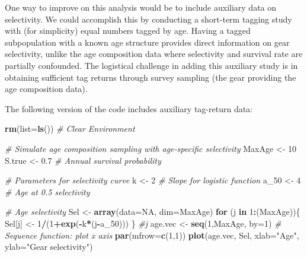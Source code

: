 \documentclass[
]{krantz}
\makeatletter
\newenvironment{Shaded}{\begin{snugshade}}{\end{snugshade}}
\newcommand{\AttributeTok}[1]{\textcolor[rgb]{0.27,0.27,0.27}{#1}}
\newcommand{\CommentTok}[1]{\textcolor[rgb]{0.37,0.37,0.37}{\textit{#1}}}
\newcommand{\ConstantTok}[1]{\textcolor[rgb]{0.37,0.37,0.37}{#1}}
\newcommand{\ControlFlowTok}[1]{\textcolor[rgb]{0.27,0.27,0.27}{\textbf{#1}}}
\newcommand{\DecValTok}[1]{\textcolor[rgb]{0.06,0.06,0.06}{#1}}
\newcommand{\FloatTok}[1]{\textcolor[rgb]{0.06,0.06,0.06}{#1}}
\newcommand{\FunctionTok}[1]{\textcolor[rgb]{0.27,0.27,0.27}{\textbf{#1}}}
\newcommand{\NormalTok}[1]{#1}
\newcommand{\OtherTok}[1]{\textcolor[rgb]{0.37,0.37,0.37}{#1}}
\newcommand{\SpecialCharTok}[1]{\textcolor[rgb]{0.43,0.43,0.43}{\textbf{#1}}}
\newcommand{\StringTok}[1]{\textcolor[rgb]{0.5,0.5,0.5}{#1}}
\newenvironment{kframe}{%
\medskip{}
\setlength{\fboxsep}{.8em}
 \def\at@end@of@kframe{}%
 \ifinner\ifhmode%
  \def\at@end@of@kframe{\end{minipage}}%
  \begin{minipage}{\columnwidth}%
 \fi\fi%
 \def\FrameCommand##1{\hskip\@totalleftmargin \hskip-\fboxsep
 \colorbox{shadecolor}{##1}\hskip-\fboxsep
     \hskip-\linewidth \hskip-\@totalleftmargin \hskip\columnwidth}%
 \MakeFramed {\advance\hsize-\width
   \@totalleftmargin\z@ \linewidth\hsize
   \@setminipage}}%
 {\par\unskip\endMakeFramed%
 \at@end@of@kframe}
\renewenvironment{Shaded}{\begin{kframe}}{\end{kframe}}
\makeatother
\begin{document}
One way to improve on this analysis would be to include auxiliary data on selectivity. We could accomplish this by conducting a short-term tagging study with (for simplicity) equal numbers tagged by age. Having a tagged subpopulation with a known age structure provides direct information on gear selectivity, unlike the age composition data where selectivity and survival rate are partially confounded. The logistical challenge in adding this auxiliary study is in obtaining sufficient tag returns through survey sampling (the gear providing the age composition data).

The following version of the code includes auxiliary tag-return data:

\begin{Shaded}
\begin{Highlighting}[]
\FunctionTok{rm}\NormalTok{(}\AttributeTok{list=}\FunctionTok{ls}\NormalTok{()) }\CommentTok{\# Clear Environment}

\CommentTok{\# Simulate age composition sampling with age{-}specific selectivity}
\NormalTok{MaxAge }\OtherTok{\textless{}{-}} \DecValTok{10}
\NormalTok{S.true }\OtherTok{\textless{}{-}} \FloatTok{0.7} \CommentTok{\# Annual survival probability}

\CommentTok{\# Parameters for selectivity curve}
\NormalTok{k }\OtherTok{\textless{}{-}} \DecValTok{2} \CommentTok{\# Slope for logistic function}
\NormalTok{a\_50 }\OtherTok{\textless{}{-}} \DecValTok{4} \CommentTok{\# Age at 0.5 selectivity}

\CommentTok{\# Age selectivity}
\NormalTok{Sel }\OtherTok{\textless{}{-}} \FunctionTok{array}\NormalTok{(}\AttributeTok{data=}\ConstantTok{NA}\NormalTok{, }\AttributeTok{dim=}\NormalTok{MaxAge)}
\ControlFlowTok{for}\NormalTok{ (j }\ControlFlowTok{in} \DecValTok{1}\SpecialCharTok{:}\NormalTok{(MaxAge))\{}
\NormalTok{  Sel[j] }\OtherTok{\textless{}{-}} \DecValTok{1}\SpecialCharTok{/}\NormalTok{(}\DecValTok{1}\SpecialCharTok{+}\FunctionTok{exp}\NormalTok{(}\SpecialCharTok{{-}}\NormalTok{k}\SpecialCharTok{*}\NormalTok{(j}\SpecialCharTok{{-}}\NormalTok{a\_50)))}
\NormalTok{\} }\CommentTok{\#j}
\NormalTok{age.vec }\OtherTok{\textless{}{-}} \FunctionTok{seq}\NormalTok{(}\DecValTok{1}\NormalTok{,MaxAge, }\AttributeTok{by=}\DecValTok{1}\NormalTok{)  }\CommentTok{\# Sequence function: plot x axis}
\FunctionTok{par}\NormalTok{(}\AttributeTok{mfrow=}\FunctionTok{c}\NormalTok{(}\DecValTok{1}\NormalTok{,}\DecValTok{1}\NormalTok{))}
\FunctionTok{plot}\NormalTok{(age.vec, Sel, }\AttributeTok{xlab=}\StringTok{"Age"}\NormalTok{, }\AttributeTok{ylab=}\StringTok{"Gear selectivity"}\NormalTok{)}


\end{Highlighting}
\end{Shaded}
\end{document}
